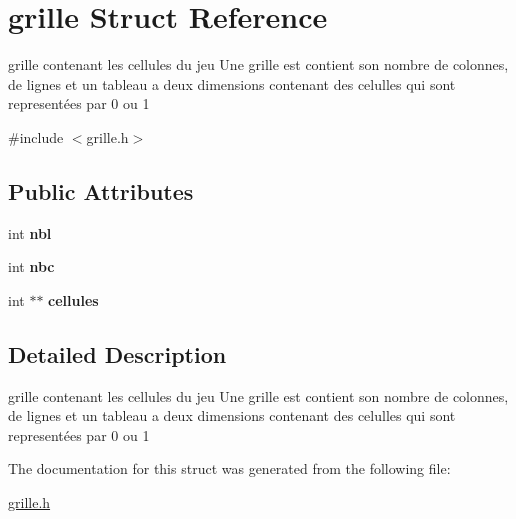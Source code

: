 \hypertarget{structgrille}{}\section{grille Struct Reference}
\label{structgrille}


grille contenant les cellules du jeu Une grille est contient son nombre de colonnes, de lignes et un tableau a deux dimensions contenant des celulles qui sont representées par 0 ou 1  




{\ttfamily \#include $<$grille.\+h$>$}

\subsection*{Public Attributes}
\begin{DoxyCompactItemize}
\item 
\mbox{\label{structgrille_a0b4da1e205825df205b0c004d105d62a}} 
int {\bfseries nbl}
\item 
\mbox{\label{structgrille_a48d6706d41bee6fff9200d872b8b0cd0}} 
int {\bfseries nbc}
\item 
\mbox{\label{structgrille_a428cf0c0297ce04e0206ba0067ac3b42}} 
int $\ast$$\ast$ {\bfseries cellules}
\end{DoxyCompactItemize}


\subsection{Detailed Description}
grille contenant les cellules du jeu Une grille est contient son nombre de colonnes, de lignes et un tableau a deux dimensions contenant des celulles qui sont representées par 0 ou 1 

The documentation for this struct was generated from the following file\+:\begin{DoxyCompactItemize}
\item 
\mbox{\hyperlink{grille_8h}{grille.\+h}}\end{DoxyCompactItemize}
